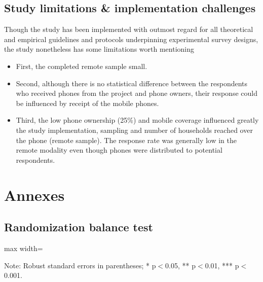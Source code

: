 \documentclass[11pt,harvard]{article}
\begin{document}
\subsection{Study limitations \& implementation challenges}
Though the study has been implemented with outmost regard for all theoretical and empirical guidelines and protocols underpinning experimental survey designs, the study nonetheless has some limitations worth mentioning
\begin{itemize}
	\item First, the completed remote sample small. 
	\item Second, although there is no statistical difference between the respondents who received phones from the project and phone owners, their response could be influenced by receipt of the mobile phones. 
	\item Third, the low phone ownership (25\%) and mobile coverage influenced greatly the study implementation, sampling and number of households reached over the phone (remote sample). The response rate was generally low in the remote modality even though phones were distributed to potential respondents.
	\end{itemize}

\pagebreak


\section{Annexes}

\subsection{Randomization balance test}

\begin{table}[htbp]
	\centering
	\begin{adjustbox}{max width=\textwidth}
		\begin{threeparttable}
			\caption{Balance Table for Randomized Survey Modality Assignment: Face-to-Face vs. Remote}
			\scriptsize
			 
			\label{tab:CAR_Listing_Demo_Balance_Modality}
			\begin{tablenotes}
				\item Note: Robust standard errors in parentheses; * p$<$0.05, ** p$<$0.01, *** p$<$0.001. 
			\end{tablenotes}
		\end{threeparttable}
	\end{adjustbox}
\end{table}
\end{document}
